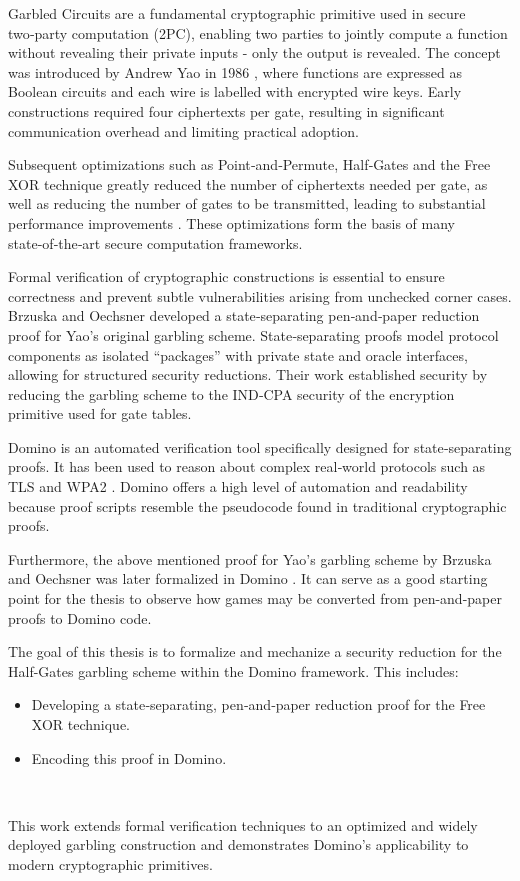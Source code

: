 \noindent%
Garbled Circuits are a fundamental cryptographic primitive used in secure two‑party computation (2PC), enabling two parties to jointly compute a function without revealing their private inputs - only the output is revealed. The concept was introduced by Andrew Yao in 1986 \cite{FOCS:Yao86}, where functions are expressed as Boolean circuits and each wire is labelled with encrypted wire keys. Early constructions required four ciphertexts per gate, resulting in significant communication overhead and limiting practical adoption.

Subsequent optimizations such as Point‑and‑Permute, Half‑Gates and the Free {XOR} technique greatly reduced the number of ciphertexts needed per gate, as well as reducing the number of gates to be transmitted, leading to substantial performance improvements \cite{STOC:BeaMicRog90,EC:ZahRosEva15,ALP:KolSch08}. These optimizations form the basis of many state‑of‑the‑art secure computation frameworks.

Formal verification of cryptographic constructions is essential to ensure correctness and prevent subtle vulnerabilities arising from unchecked corner cases. Brzuska and Oechsner \cite{CSF:BrzOec23} developed a state‑separating pen‑and‑paper reduction proof for Yao’s original garbling scheme. State‑separating proofs model protocol components as isolated “packages” with private state and oracle interfaces, allowing for structured security reductions. Their work established security by reducing the garbling scheme to the IND‑CPA security of the encryption primitive used for gate tables.

Domino is an automated verification tool specifically designed for state‑separating proofs. It has been used to reason about complex real‑world protocols such as TLS \cite{rajabi_towards_2025} and WPA2 \cite{domino:paper}. Domino offers a high level of automation and readability because proof scripts resemble the pseudocode found in traditional cryptographic proofs.

Furthermore, the above mentioned proof for Yao's garbling scheme by Brzuska and Oechsner \cite{CSF:BrzOec23} was later formalized in Domino \cite{domino:paper}. It can serve as a good starting point for the thesis to observe how games may be converted from pen-and-paper proofs to Domino code.

The goal of this thesis is to formalize and mechanize a security reduction for the Half-Gates garbling scheme within the Domino framework. This includes:
\begin{itemize}
    \item Developing a state‑separating, pen‑and‑paper reduction proof for the Free XOR technique.
    \item Encoding this proof in Domino.
\end{itemize} \

This work extends formal verification techniques to an optimized and widely deployed garbling construction and demonstrates Domino’s applicability to modern cryptographic primitives.

